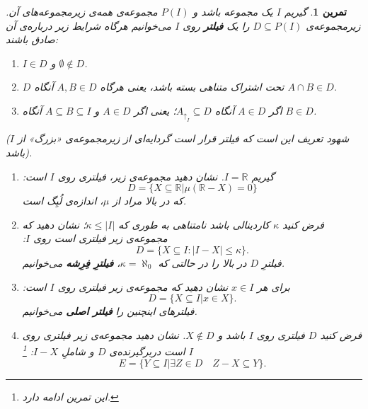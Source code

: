 \documentclass[12pt,a4paper]{report}
\theoremstyle{colorhead}
\newtheorem{tam}{تمرین}
\begin{document}
\begin{tam}
\label{filter}
گیریم 
$I$
یک مجموعه باشد و
$P(I)$
مجموعه‌ی همه‌ی زیرمجموعه‌های آن. زیرمجموعه‌ی
$D\subseteq P(I)$
را 
یک
\textbf{فیلتر}
روی
$I$
می‌خوانیم هرگاه شرایط زیر درباره‌ی آن صادق باشند:
\begin{enumerate}
\item 
$I\in D$
و
$\emptyset\not\in D$.
\item
$D$
تحت اشتراک متناهی بسته باشد، یعنی هرگاه
$A,B\in D$
آنگاه
$A\cap B\in D$.
\item 
اگر
$A\in D$
آنگاه
$A_{\uparrow_I} \subseteq D$؛ 
یعنی اگر
$A\in D$
و
$A\subseteq B\subseteq I$
آنگاه
$B\in D$.
\end{enumerate}
(شهود تعریف این است که فیلتر قرار است گردایه‌ای از زیرمجموعه‌ی «بزرگ» از  
$I$
باشد).
\begin{enumerate}
\item 
گیریم
$I=\mathbb{R}$.
نشان دهید 
مجموعه‌ی زیر،‌ فیلتری روی
$I$
است:
\[
D=\{X\subseteq \mathbb{R}| \mu (\mathbb{R}-X)=0\}
\]
که در بالا مراد از
$\mu$،
اندازه‌ی لُبِگ است.
\item 
فرض کنید
$\kappa$
کاردینالی باشد نامتناهی به طوری که
$\kappa \leq |I|$؛
نشان دهید که مجموعه‌ی زیر فیلتری است روی
$I$:
\[
D=\{X\subseteq I: |I-X|\leq \kappa\}.
\]
فیلترِ
$D$
در بالا را در حالتی که
$\kappa=\aleph_0$،
\textbf{فیلترِ فِرِشه }
می‌خوانیم.
\item 
برای 
هر
$x\in I$
نشان دهید که مجموعه‌ی زیر فیلتری روی
$I$
است:
\[
D=\{X\subseteq I|x\in X\}.
\]
فیلترهای اینچنین را 
\textbf{فیلتر اصلی}
 می‌خوانیم.
 \item 
 فرض کنید
 $D$
 فیلتری روی
 $I$
 باشد و
 $X\not \in D$.
 نشان دهید مجموعه‌ی زیر فیلتری روی
 $I$
 است دربرگیرنده‌ی
 $D$
و شاملِ
$I-X$:
\footnote{این تمرین ادامه دارد.}
\[
E=\{Y\subseteq I|\exists Z\in D \quad Z-X\subseteq Y\}.
\] 
\end{enumerate}
\end{tam}
\end{document}
